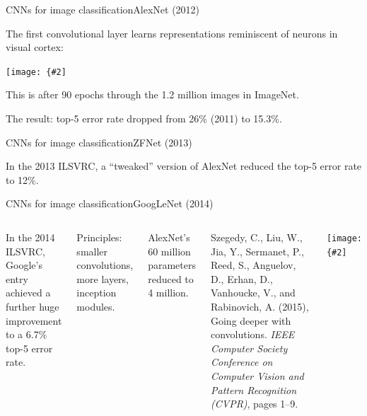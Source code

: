 \documentclass[aspectratio=169]{beamer}
\newcommand{\myfig}[3]{\centerline{\texttt{[image: \{\#2]}}}
\begin{document}
\begin{frame}{CNNs for image classification}{AlexNet (2012)}

  The first convolutional layer learns representations reminiscent of
  neurons in visual cortex:

  \myfig{2in}{krizhevsky-fig3}{Krizhevsky et al.\ (2012), Fig.\ 3}

  This is after 90 epochs through the 1.2 million images in ImageNet.
  
  \medskip

  The result: top-5 error rate dropped from 26\% (2011) to 15.3\%. 
  
\end{frame}


\begin{frame}{CNNs for image classification}{ZFNet (2013)}

  In the 2013 ILSVRC, a ``tweaked'' version of AlexNet reduced the
  top-5 error rate to 12\%.
  
\end{frame}

\begin{frame}{CNNs for image classification}{GoogLeNet (2014)}

  \begin{columns}

    \column{3in}

    In the 2014 ILSVRC, Google's entry achieved a further huge
    improvement to a 6.7\% top-5 error rate.

    \medskip

    Principles: smaller convolutions, more layers, \alert{inception}
    modules.

    \medskip

    AlexNet's 60 million parameters reduced to 4 million.

    \medskip

    Szegedy, C., Liu, W., Jia, Y., Sermanet, P., 
    Reed, S., Anguelov, D., Erhan, D., Vanhoucke, V., and 
    Rabinovich, A. (2015), Going deeper with convolutions.
    \textit{IEEE Computer Society Conference on Computer Vision and Pattern
    Recognition (CVPR)}, pages 1--9.

    \column{1.5in}

    \myfig{0.55in}{szegedy-fig3}{Szegedy et al.\ (2014), Fig.\ 3}

  \end{columns}
  
\end{frame}
\end{document}
